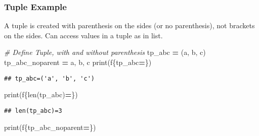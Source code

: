 \documentclass[
]{book}
\newenvironment{Shaded}{\begin{snugshade}}{\end{snugshade}}
\newcommand{\BuiltInTok}[1]{#1}
\newcommand{\CommentTok}[1]{\textcolor[rgb]{0.56,0.35,0.01}{\textit{#1}}}
\newcommand{\NormalTok}[1]{#1}
\newcommand{\OperatorTok}[1]{\textcolor[rgb]{0.81,0.36,0.00}{\textbf{#1}}}
\newcommand{\SpecialCharTok}[1]{\textcolor[rgb]{0.00,0.00,0.00}{#1}}
\newcommand{\SpecialStringTok}[1]{\textcolor[rgb]{0.31,0.60,0.02}{#1}}
\newcommand{\StringTok}[1]{\textcolor[rgb]{0.31,0.60,0.02}{#1}}
\begin{document}
\hypertarget{tuple-example}{%
\subsubsection{Tuple Example}\label{tuple-example}}

A tuple is created with parenthesis on the sides (or no parenthesis), not brackets on the sides. Can access values in a tuple as in list.

\begin{Shaded}
\begin{Highlighting}[]
\CommentTok{\# Define Tuple, with and without parenthesis}
\NormalTok{tp\_abc }\OperatorTok{=}\NormalTok{ (}\StringTok{\textquotesingle{}a\textquotesingle{}}\NormalTok{, }\StringTok{\textquotesingle{}b\textquotesingle{}}\NormalTok{, }\StringTok{\textquotesingle{}c\textquotesingle{}}\NormalTok{)}
\NormalTok{tp\_abc\_noparent }\OperatorTok{=} \StringTok{\textquotesingle{}a\textquotesingle{}}\NormalTok{, }\StringTok{\textquotesingle{}b\textquotesingle{}}\NormalTok{, }\StringTok{\textquotesingle{}c\textquotesingle{}}
\BuiltInTok{print}\NormalTok{(}\SpecialStringTok{f\textquotesingle{}}\SpecialCharTok{\{}\NormalTok{tp\_abc}\OperatorTok{=}\SpecialCharTok{\}}\SpecialStringTok{\textquotesingle{}}\NormalTok{)}
\end{Highlighting}
\end{Shaded}

\begin{verbatim}
## tp_abc=('a', 'b', 'c')
\end{verbatim}

\begin{Shaded}
\begin{Highlighting}[]
\BuiltInTok{print}\NormalTok{(}\SpecialStringTok{f\textquotesingle{}}\SpecialCharTok{\{}\BuiltInTok{len}\NormalTok{(tp\_abc)}\OperatorTok{=}\SpecialCharTok{\}}\SpecialStringTok{\textquotesingle{}}\NormalTok{)}
\end{Highlighting}
\end{Shaded}

\begin{verbatim}
## len(tp_abc)=3
\end{verbatim}

\begin{Shaded}
\begin{Highlighting}[]
\BuiltInTok{print}\NormalTok{(}\SpecialStringTok{f\textquotesingle{}}\SpecialCharTok{\{}\NormalTok{tp\_abc\_noparent}\OperatorTok{=}\SpecialCharTok{\}}\SpecialStringTok{\textquotesingle{}}\NormalTok{)}
\end{Highlighting}
\end{Shaded}
\end{document}
